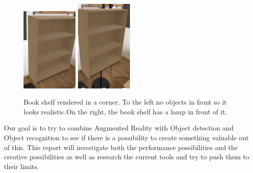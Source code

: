 \begin{figure}[hbtp]
\begin{center}
\includegraphics[width = 0.25\textwidth]{./Images/overlapping2.jpg} 
\includegraphics[width = 0.25\textwidth]{./Images/overlapping1.jpg} 
\caption{Book shelf rendered in a corner. To the left no objects in front so it looks realistic.On the right, the book shelf has a lamp in front of it.}
\end{center}
\end{figure}

Our goal is to try to combine Augmented Reality with Object detection and Object recognition to see if there is a possibility to create something valuable out of this. This report will investigate both the performance possibilities and the creative possibilities as well as research the current tools and try to push them to their limits.


\newpage
